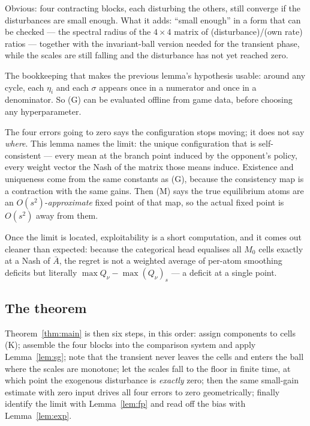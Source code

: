 \documentclass[11pt]{article}
\theoremstyle{definition}
\begin{document}
\begin{description}[leftmargin=0pt, style=unboxed, font=\normalfont\itshape]
\item[Lemma~\ref{lem:sg}.] Obvious: four contracting blocks, each disturbing the
  others, still converge if the disturbances are small enough. What it adds:
  ``small enough'' in a form that can be checked --- the spectral radius of the
  $4\times4$ matrix of (disturbance)/(own rate) ratios --- together with the
  invariant-ball version needed for the transient phase, while the scales are
  still falling and the disturbance has not yet reached zero.
\item[Lemma~\ref{lem:cyclefree}.] The bookkeeping that makes the previous lemma's
  hypothesis usable: around any cycle, each $\eta_i$ and each $\sigma$ appears
  once in a numerator and once in a denominator. So (G) can be evaluated offline
  from game data, before choosing any hyperparameter.
\item[Lemma~\ref{lem:fp}.] The four errors going to zero says the configuration
  stops moving; it does not say \emph{where}. This lemma names the limit: the
  unique configuration that is self-consistent --- every mean at the branch point
  induced by the opponent's policy, every weight vector the Nash of the matrix
  those means induce. Existence and uniqueness come from the same constants as
  (G), because the consistency map is a contraction with the same gains. Then (M)
  says the true equilibrium atoms are an $O(s^2)$-\emph{approximate} fixed point
  of that map, so the actual fixed point is $O(s^2)$ away from them.
\item[Lemma~\ref{lem:exp}.] Once the limit is located, exploitability is a short
  computation, and it comes out cleaner than expected: because the categorical
  head equalises all $M_0$ cells exactly at a Nash of $\bar A$, the regret is not
  a weighted average of per-atom smoothing deficits but literally
  $\max Q_\nu - \max (Q_\nu)_s$ --- a deficit at a single point.
\end{description}

\subsection*{The theorem}

Theorem~\ref{thm:main} is then six steps, in this order:
assign components to cells (K); assemble the four blocks into the comparison
system and apply Lemma~\ref{lem:sg}; note that the transient never leaves the
cells and enters the ball where the scales are monotone; let the scales fall to
the floor in finite time, at which point the exogenous disturbance is
\emph{exactly} zero; then the same small-gain estimate with zero input drives all
four errors to zero geometrically; finally identify the limit with
Lemma~\ref{lem:fp} and read off the bias with Lemma~\ref{lem:exp}.
\end{document}
